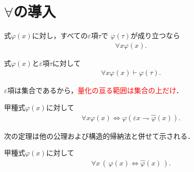 \section{$\forall$の導入}
	\begin{screen}
		\begin{logicalaxm}
			式$\varphi(x)$に対し，すべての$\varepsilon$項$\tau$で
			$\varphi(\tau)$が成り立つなら
			\begin{align}
				\forall x \varphi(x).
			\end{align}
		\end{logicalaxm}
	\end{screen}
	
	\begin{screen}
		\begin{logicalaxm}
			式$\varphi(x)$と$\varepsilon$項$\tau$に対して
			\begin{align}
				\forall x \varphi(x) \vdash \varphi(\tau).
			\end{align}
		\end{logicalaxm}
	\end{screen}
	
	$\varepsilon$項は集合であるから，\textcolor{red}{量化の亘る範囲は集合の上だけ}．
	
\newpage
	\begin{screen}
		\begin{thm}
			甲種式$\varphi(x)$に対して
			\begin{align}
				\forall x \varphi(x) \Longleftrightarrow
				\varphi\left(\varepsilon x \rightharpoondown \hat{\varphi}(x)\right).
			\end{align}
		\end{thm}
	\end{screen}
	
	次の定理は他の公理および構造的帰納法と併せて示される．
	
	\begin{screen}
		\begin{thm}[書き換えの同値性]
			甲種式$\varphi(x)$に対して
			\begin{align}
				\forall x\,
				\left(\, \varphi(x) \Longleftrightarrow \hat{\varphi}(x)\, \right).
			\end{align}
		\end{thm}
	\end{screen}